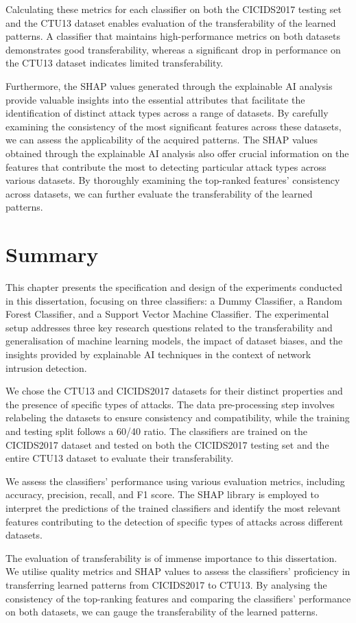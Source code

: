 Calculating these metrics for each classifier on both the CICIDS2017 testing set and the CTU13 dataset enables evaluation of the transferability of the learned patterns. A classifier that maintains high-performance metrics on both datasets demonstrates good transferability, whereas a significant drop in performance on the CTU13 dataset indicates limited transferability.

Furthermore, the SHAP values generated through the explainable AI analysis provide valuable insights into the essential attributes that facilitate the identification of distinct attack types across a range of datasets. By carefully examining the consistency of the most significant features across these datasets, we can assess the applicability of the acquired patterns. The SHAP values obtained through the explainable AI analysis also offer crucial information on the features that contribute the most to detecting particular attack types across various datasets. By thoroughly examining the top-ranked features' consistency across datasets, we can further evaluate the transferability of the learned patterns.

\section{Summary}\label{sec:Summary}

This chapter presents the specification and design of the experiments conducted in this dissertation, focusing on three classifiers: a Dummy Classifier, a Random Forest Classifier, and a Support Vector Machine Classifier. The experimental setup addresses three key research questions related to the transferability and generalisation of machine learning models, the impact of dataset biases, and the insights provided by explainable AI techniques in the context of network intrusion detection.

We chose the CTU13 and CICIDS2017 datasets for their distinct properties and the presence of specific types of attacks. The data pre-processing step involves relabeling the datasets to ensure consistency and compatibility, while the training and testing split follows a 60/40 ratio. The classifiers are trained on the CICIDS2017 dataset and tested on both the CICIDS2017 testing set and the entire CTU13 dataset to evaluate their transferability.

We assess the classifiers' performance using various evaluation metrics, including accuracy, precision, recall, and F1 score. The SHAP library is employed to interpret the predictions of the trained classifiers and identify the most relevant features contributing to the detection of specific types of attacks across different datasets.

The evaluation of transferability is of immense importance to this dissertation. We utilise quality metrics and SHAP values to assess the classifiers' proficiency in transferring learned patterns from CICIDS2017 to CTU13. By analysing the consistency of the top-ranking features and comparing the classifiers' performance on both datasets, we can gauge the transferability of the learned patterns.